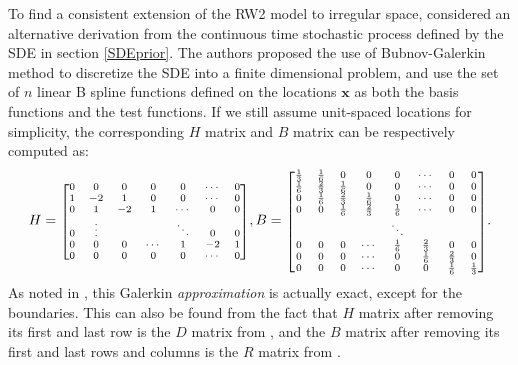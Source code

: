 \documentclass{article}
\begin{document}
To find a consistent extension of the RW2 model to irregular space, \citep{rw2} considered an alternative derivation from the continuous time stochastic process defined by the SDE in section \ref{SDEprior}. The authors proposed the use of Bubnov-Galerkin method to discretize the SDE into a finite dimensional problem, and use the set of $n$ linear B spline functions defined on the locations $\boldsymbol{x}$ as both the basis functions and the test functions. If we still assume unit-spaced locations for simplicity, the corresponding $H$ matrix and $B$ matrix can be respectively computed as:
\begin{equation}\label{HandB}
\begin{aligned}
H = \mbox{\scriptsize $\begin{bmatrix}
0 & 0 & 0 & 0 & 0 & \cdots & 0\\
1 & -2 & 1 & 0 & 0 & \cdots & 0\\
0 & 1 & -2 & 1 & \cdots & 0 & 0\\
0 & \vdots &  &  & \ddots & 0 & 0\\
0 & 0 & 0 & \cdots & 1 & -2 & 1\\
0 & 0 & 0 & 0 & 0 & \cdots & 0\\
\end{bmatrix}$},
B = \mbox{\scriptsize $\begin{bmatrix}
\frac{1}{3} & \frac{1}{6} & 0 & 0 & 0 & \cdots & 0 & 0\\
\frac{1}{6} & \frac{2}{3} & \frac{1}{6} & 0 & 0 & \cdots & 0 & 0\\
0 & \frac{1}{6} & \frac{2}{3} & \frac{1}{6} & 0 & \cdots & 0 & 0\\
0 & 0 & \frac{1}{6} & \frac{2}{3} & \frac{1}{6} & \cdots & 0 & 0\\
 &  &  &  & \ddots &  & & \\
 0 & 0 & 0 & \cdots & \frac{1}{6} & \frac{2}{3} & 0 & 0\\
0 & 0 & 0 & \cdots & 0 & \frac{1}{6} & \frac{2}{3} & 0\\
0 & 0 & 0 & \cdots & 0 & 0 & \frac{1}{6} & \frac{1}{3} \\
\end{bmatrix}$}.
\end{aligned}
\end{equation}
As noted in \cite{rw2}, this Galerkin \textit{approximation} is actually exact, except for the boundaries. This can also be found from the fact that $H$ matrix after removing its first and last row is the $D$ matrix from \cite{ARIMA}, and the $B$ matrix after removing its first and last rows and columns is the $R$ matrix from \cite{ARIMA}.
\end{document}

